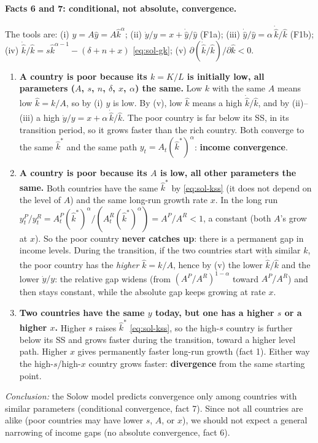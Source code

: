 \paragraph{Facts 6 and 7: conditional, not absolute, convergence.} The tools are:
(i) $y=A\hat y=A\hat k^{\alpha}$; (ii) $\dot y/y=x+\dot{\hat y}/\hat y$ (F1a); (iii) $\dot{\hat y}/\hat y=\alpha\,\dot{\hat k}/\hat k$ (F1b); (iv) $\dot{\hat k}/\hat k=s\hat k^{\alpha-1}-(\delta+n+x)$ \eqref{eq:sol-gk}; (v) $\partial(\dot{\hat k}/\hat k)/\partial\hat k<0$.
\begin{enumerate}[label=(\alph*)]
  \item \textbf{A country is poor because its $k=K/L$ is initially low, all parameters ($A$, $s$, $n$, $\delta$, $x$, $\alpha$) the same.}
  Low $k$ with the same $A$ means low $\hat k=k/A$, so by (i) $y$ is low. By (v), low $\hat k$ means a high $\dot{\hat k}/\hat k$, and by (ii)--(iii) a high $\dot y/y = x+\alpha\,\dot{\hat k}/\hat k$. The poor country is far below its SS, in its transition period, so it grows faster than the rich country. Both converge to the same $\hat k^*$ and the same path $y_t=A_t(\hat k^*)^{\alpha}$: \textbf{income convergence}.
  \item \textbf{A country is poor because its $A$ is low, all other parameters the same.}
  Both countries have the same $\hat k^*$ by \eqref{eq:sol-kss} (it does not depend on the level of $A$) and the same long-run growth rate $x$. In the long run $y^{P}_t/y^{R}_t = A^P_t(\hat k^*)^{\alpha}/(A^R_t(\hat k^*)^{\alpha}) = A^P/A^R<1$, a constant (both $A$'s grow at $x$). So the poor country \textbf{never catches up}: there is a permanent gap in income levels. During the transition, if the two countries start with similar $k$, the poor country has the \emph{higher} $\hat k=k/A$, hence by (v) the lower $\dot{\hat k}/\hat k$ and the lower $\dot y/y$: the relative gap widens (from $(A^P/A^R)^{1-\alpha}$ toward $A^P/A^R$) and then stays constant, while the absolute gap keeps growing at rate $x$.
  \item \textbf{Two countries have the same $y$ today, but one has a higher $s$ or a higher $x$.}
  Higher $s$ raises $\hat k^*$ \eqref{eq:sol-kss}, so the high-$s$ country is further below its SS and grows faster during the transition, toward a higher level path. Higher $x$ gives permanently faster long-run growth (fact 1). Either way the high-$s$/high-$x$ country grows faster: \textbf{divergence} from the same starting point.
\end{enumerate}
\textit{Conclusion:} the Solow model predicts convergence only among countries with similar parameters (conditional convergence, fact 7). Since not all countries are alike (poor countries may have lower $s$, $A$, or $x$), we should not expect a general narrowing of income gaps (no absolute convergence, fact 6).

